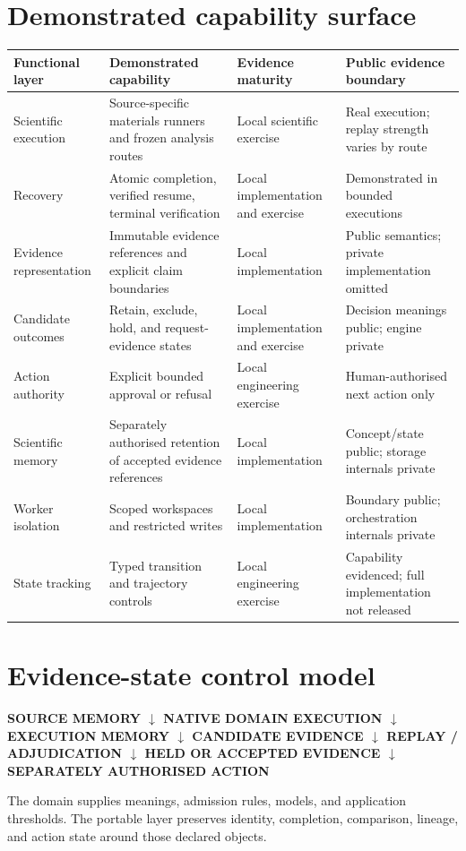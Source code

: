 \documentclass[9pt,a4paper]{article}
\begin{document}
\section{Demonstrated capability surface}
\begin{longtable}{p{}p{}p{}p{}}
\toprule Functional layer & Demonstrated capability & Evidence maturity & Public evidence boundary\\\midrule
Scientific execution & Source-specific materials runners and frozen analysis routes & Local scientific exercise & Real execution; replay strength varies by route\\
Recovery & Atomic completion, verified resume, terminal verification & Local implementation and exercise & Demonstrated in bounded executions\\
Evidence representation & Immutable evidence references and explicit claim boundaries & Local implementation & Public semantics; private implementation omitted\\
Candidate outcomes & Retain, exclude, hold, and request-evidence states & Local implementation and exercise & Decision meanings public; engine private\\
Action authority & Explicit bounded approval or refusal & Local engineering exercise & Human-authorised next action only\\
Scientific memory & Separately authorised retention of accepted evidence references & Local implementation & Concept/state public; storage internals private\\
Worker isolation & Scoped workspaces and restricted writes & Local implementation & Boundary public; orchestration internals private\\
State tracking & Typed transition and trajectory controls & Local engineering exercise & Capability evidenced; full implementation not released\\
\bottomrule
\end{longtable}

\section{Evidence-state control model}
\begin{center}\small\bfseries
SOURCE MEMORY $\downarrow$ NATIVE DOMAIN EXECUTION $\downarrow$ EXECUTION MEMORY $\downarrow$ CANDIDATE EVIDENCE $\downarrow$ REPLAY / ADJUDICATION $\downarrow$ HELD OR ACCEPTED EVIDENCE $\downarrow$ SEPARATELY AUTHORISED ACTION
\end{center}
The domain supplies meanings, admission rules, models, and application thresholds. The portable layer preserves identity, completion, comparison, lineage, and action state around those declared objects.
\end{document}
